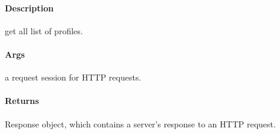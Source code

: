 \documentclass[letterpaper,10pt,english]{sphinxmanual}
\begin{document}

\begin{fulllineitems}
\label{\detokenize{gemini_perception_API:gemini_perception_API.get_perception_profile_list}}
\pysigstartsignatures
{}
\pysigstopsignatures

\paragraph{Description}
\label{\detokenize{gemini_perception_API:id14}}
\sphinxAtStartPar
get all list of profiles.


\paragraph{Args}
\label{\detokenize{gemini_perception_API:id15}}\begin{description}
\sphinxAtStartPar
a request session for HTTP requests.

\end{description}


\paragraph{Returns}
\label{\detokenize{gemini_perception_API:id16}}\begin{description}
\sphinxAtStartPar
Response object, which contains a server’s response to an HTTP request.

\end{description}

\end{fulllineitems}

\end{document}
